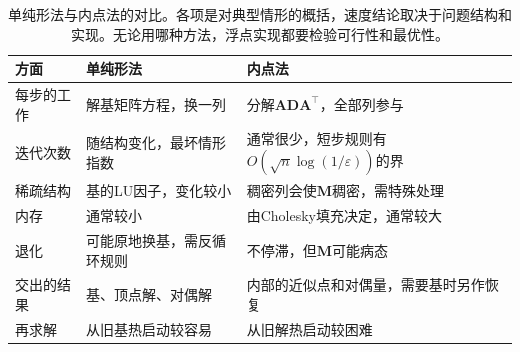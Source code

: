 \begin{table}[!htbp]
  \centering
  \begin{tabular}{@{}lll@{}}
    \toprule
    方面 & 单纯形法 & 内点法\\
    \midrule
    每步的工作 & 解基矩阵方程，换一列 & 分解$\bm{A}\bm{D}\bm{A}^\top$，全部列参与\\
    迭代次数 & 随结构变化，最坏情形指数 & 通常很少，短步规则有$O(\sqrt{n}\log(1/\varepsilon))$的界\\
    稀疏结构 & 基的LU因子，变化较小 & 稠密列会使$\bm{M}$稠密，需特殊处理\\
    内存 & 通常较小 & 由Cholesky填充决定，通常较大\\
    退化 & 可能原地换基，需反循环规则 & 不停滞，但$\bm{M}$可能病态\\
    交出的结果 & 基、顶点解、对偶解 & 内部的近似点和对偶量，需要基时另作恢复\\
    再求解 & 从旧基热启动较容易 & 从旧解热启动较困难\\
    \bottomrule
  \end{tabular}
  \caption{单纯形法与内点法的对比。各项是对典型情形的概括，速度结论取决于问题结构和实现。无论用哪种方法，浮点实现都要检验可行性和最优性。}
  \label{tab:lpipm-compare}
\end{table}

